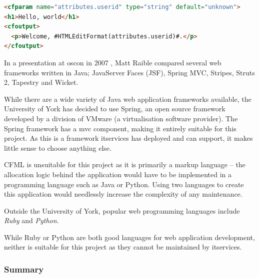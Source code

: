 \documentclass[]{scrartcl}
\begin{document}
\begin{lstlisting}[language=HTML]
<cfparam name="attributes.userid" type="string" default="unknown">
<h1>Hello, world</h1>
<cfoutput>
  <p>Welcome, #HTMLEditFormat(attributes.userid)#.</p>
</cfoutput>
\end{lstlisting}

In a presentation at \gls{oscon} in 2007 \cite{raible2007javawebframeworks},
Matt Raible compared several web frameworks written in Java; JavaServer Faces
(JSF), Spring MVC, Stripes, Struts 2, Tapestry and Wicket.

While there are a wide variety of Java web application frameworks available,
the University of York has decided to use Spring, an open source framework
developed by a division of VMware (a virtualisation software provider). The
Spring framework has a \gls{mvc} component, making it entirely suitable for
this project. As this is a framework \gls{itservices} has deployed and can
support, it makes little sense to choose anything else.

CFML is unsuitable for this project as it is primarily a markup language -- the
allocation logic behind the application would have to be implemented in a
programming language such as Java or Python. Using two languages to create
this application would needlessly increase the complexity of any maintenance.


Outside the University of York, popular web programming languages include
\emph{Ruby} and \emph{Python}.

% 
% 

While Ruby or Python are both good languages for web application development,
neither is suitable for this project as they cannot be maintained by
\gls{itservices}.

\subsubsection{Summary}
\end{document}
